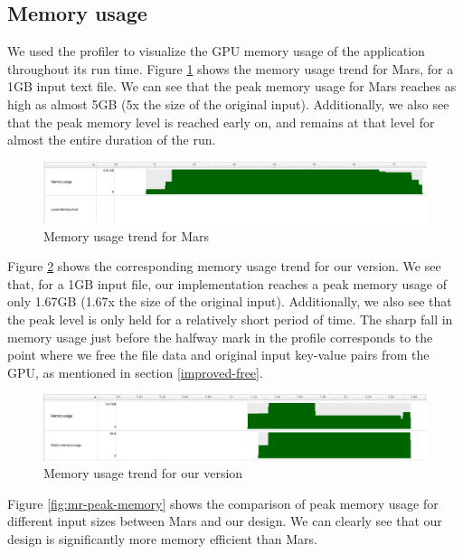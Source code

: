 \documentclass{article}
\begin{document}
\subsection{Memory usage}
We used the profiler to visualize the GPU memory usage of the application throughout its run time. Figure \ref{fig:mr-mars-memory} shows the memory usage trend for Mars, for a 1GB input text file. We can see that the peak memory usage for Mars reaches as high as almost 5GB (5x the size of the original input). Additionally, we also see that the peak memory level is reached early on, and remains at that level for almost the entire duration of the run.

\begin{figure}[h]
    \centering
    \includegraphics[width=1\linewidth]{images/mr-mars-memory.png}
    \caption{Memory usage trend for Mars}
    \label{fig:mr-mars-memory}
\end{figure}

Figure \ref{fig:mr-our-memory} shows the corresponding memory usage trend for our version. We see that, for a 1GB input file, our implementation reaches a peak memory usage of only 1.67GB (1.67x the size of the original input). Additionally, we also see that the peak level is only held for a relatively short period of time. The sharp fall in memory usage just before the halfway mark in the profile corresponds to the point where we free the file data and original input key-value pairs from the GPU, as mentioned in section \ref{improved-free}.

\begin{figure}[h]
    \centering
    \includegraphics[width=1\linewidth]{images/mr-our-memory.png}
    \caption{Memory usage trend for our version}
    \label{fig:mr-our-memory}
\end{figure}

Figure \ref{fig:mr-peak-memory} shows the comparison of peak memory usage for different input sizes between Mars and our design. We can clearly see that our design is significantly more memory efficient than Mars.
\end{document}
